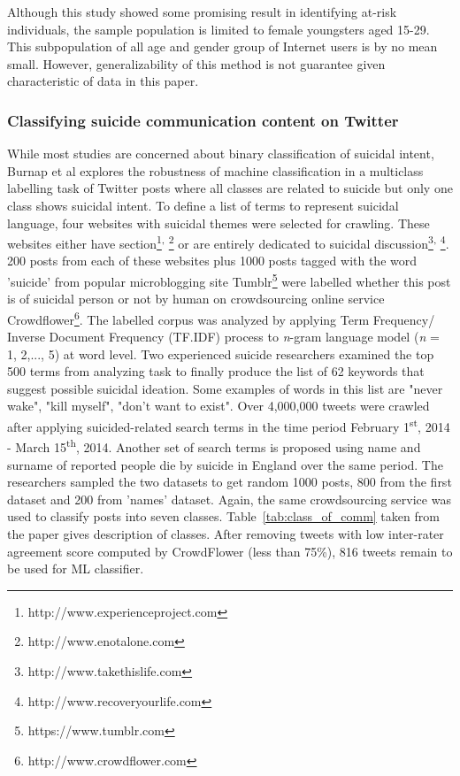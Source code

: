 Although this study showed some promising result in identifying at-risk individuals, the sample population is limited to female youngsters aged 15-29. This subpopulation of all age and gender group of Internet users is by no mean small. However, generalizability of this method is not guarantee given characteristic of data in this paper.\\
\subsubsection*{Classifying suicide communication content on Twitter}
While most studies are concerned about binary classification of suicidal intent, Burnap et al \cite{Burnap2015} explores the robustness of machine classification in a multiclass labelling task of Twitter posts where all classes are related to suicide but only one class shows suicidal intent. To define a list of terms to represent suicidal language, four websites with suicidal themes were selected for crawling. These websites either have section\footnote{http://www.experienceproject.com}\textsuperscript{, }\footnote{http://www.enotalone.com} or are entirely dedicated to suicidal discussion\footnote{http://www.takethislife.com}\textsuperscript{, }\footnote{http://www.recoveryourlife.com}. 200 posts from each of these websites plus 1000 posts tagged with the word 'suicide' from popular microblogging site Tumblr\footnote{https://www.tumblr.com} were labelled whether this post is of suicidal person or not by human on crowdsourcing online service Crowdflower\footnote{http://www.crowdflower.com}. The labelled corpus was analyzed by applying Term Frequency/ Inverse Document Frequency (TF.IDF) process to \textit{n}-gram language model (\textit{n} = 1, 2,..., 5) at word level. Two experienced suicide researchers examined the top 500 terms from analyzing task to finally produce the list of 62 keywords that suggest possible suicidal ideation. Some examples of words in this list are "never wake", "kill myself", "don't want to exist". Over 4,000,000 tweets were crawled after applying suicided-related search terms in the time period  February 1\textsuperscript{st}, 2014 - March 15\textsuperscript{th}, 2014. Another set of search terms is proposed using name and surname of reported people die by suicide in England over the same period. The researchers sampled the two datasets to get random 1000 posts, 800 from the first dataset and 200 from 'names' dataset. Again, the same crowdsourcing service was used to classify posts into seven classes. Table~\ref{tab:class_of_comm} taken from the paper \cite{Burnap2015} gives description of classes. After removing tweets with low inter-rater agreement score computed by CrowdFlower (less than 75\%), 816 tweets remain to be used for ML classifier.
